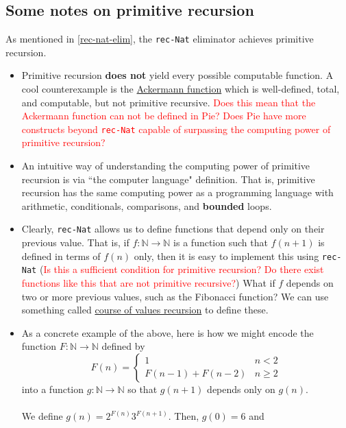 \documentclass{article}
\newcommand{\ttt}[1]{\texttt{#1}}
\newcommand{\bb}[1]{\mathbb{#1}}
\newcommand{\bN}{\bb{N}}
\begin{document}
\subsection{Some notes on primitive recursion}
As mentioned in \autoref{rec-nat-elim}, the \ttt{rec-Nat} eliminator achieves primitive recursion.
\begin{itemize}
    \item 
        Primitive recursion \textbf{does not} yield every possible computable function. A cool counterexample is the \href{https://en.wikipedia.org/wiki/Ackermann_function}{Ackermann function} which is well-defined, total, and computable, but not primitive recursive. \textcolor{red}{Does this mean that the Ackermann function can not be defined in Pie? Does Pie have more constructs beyond \ttt{rec-Nat} capable of surpassing the computing power of primitive recursion?}
    \item
        An intuitive way of understanding the computing power of primitive recursion is via ``the computer language" definition. That is, primitive recursion has the same computing power as a programming language with arithmetic, conditionals, comparisons, and \textbf{bounded} loops.
    \item
        Clearly, \ttt{rec-Nat} allows us to define functions that depend only on their previous value. That is, if \(f : \mathbb{N} \to \mathbb{N}\) is a function such that \(f(n + 1)\) is defined in terms of \(f(n)\) only, then it is easy to implement this using \ttt{rec-Nat} (\textcolor{red}{Is this a sufficient condition for primitive recursion? Do there exist functions like this that are not primitive recursive?}) What if \(f\) depends on two or more previous values, such as the Fibonacci function? We can use something called \href{https://en.wikipedia.org/wiki/Course-of-values_recursion}{course of values recursion} to define these.
    \item
        As a concrete example of the above, here is how we might encode the function \(F : \bN \to \bN\) defined by \[
            F(n) = \begin{cases}
                        1 & n < 2 \\
                        F(n - 1) + F(n - 2) & n \geq 2
                   \end{cases}
        \]
        into a function \(g : \bN \to \bN\) so that \(g(n + 1)\) depends only on \(g(n)\). 
        \\ \\
        We define \(g(n) = 2^{F(n)}3^{F(n + 1)}\). Then, \(g(0) = 6\) and \begin{align*}

\end{align*}
\end{itemize}
\end{document}
